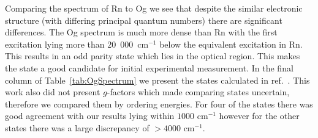 \documentclass[10pt,a4paper, twoside, openright]{report}
\begin{document}
Comparing the spectrum of Rn  to Og we see that despite the similar electronic structure (with differing principal quantum numbers) there are significant differences. The Og spectrum is much more dense than Rn  with the first excitation lying more than 20~000~cm$^{-1}$ below the equivalent excitation in Rn. This results in an odd parity state which lies in the optical region. This makes the  state a good candidate for initial experimental measurement. In the final column of Table~\ref{tab:OgSpectrum} we present the states calculated in ref.~\cite{Indelicato2007}. This work also did not present $g$-factors which made comparing states uncertain, therefore we compared them by ordering energies. For four of the states there was good agreement with our results lying within $1000$ cm$^{-1}$ however for the other states there was a large discrepancy of $>4000$ cm$^{-1}$.  \\
\end{document}
